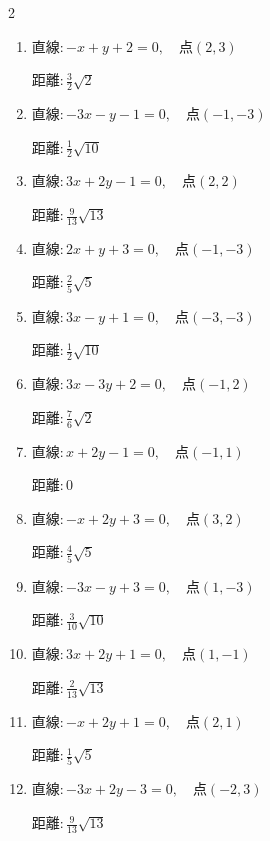 \begin{multicols}{2}
\begin{enumerate}
  \item $直線:-x+y+2=0,\quad 点 ( 2, 3 )$

        $\displaystyle 距離 : \frac{3}{2}\sqrt{2}$

  \item $直線:-3x-y-1=0,\quad 点 ( -1, -3 )$

        $\displaystyle 距離 : \frac{1}{2}\sqrt{10}$

  \item $直線:3x+2y-1=0,\quad 点 ( 2, 2 )$

        $\displaystyle 距離 : \frac{9}{13}\sqrt{13}$

  \item $直線:2x+y+3=0,\quad 点 ( -1, -3 )$

        $\displaystyle 距離 : \frac{2}{5}\sqrt{5}$

  \item $直線:3x-y+1=0,\quad 点 ( -3, -3 )$

        $\displaystyle 距離 : \frac{1}{2}\sqrt{10}$

  \item $直線:3x-3y+2=0,\quad 点 ( -1, 2 )$

        $\displaystyle 距離 : \frac{7}{6}\sqrt{2}$

  \item $直線:x+2y-1=0,\quad 点 ( -1, 1 )$

        $\displaystyle 距離 : 0$

  \item $直線:-x+2y+3=0,\quad 点 ( 3, 2 )$

        $\displaystyle 距離 : \frac{4}{5}\sqrt{5}$

  \item $直線:-3x-y+3=0,\quad 点 ( 1, -3 )$

        $\displaystyle 距離 : \frac{3}{10}\sqrt{10}$

\columnbreak %

  \item $直線:3x+2y+1=0,\quad 点 ( 1, -1 )$

        $\displaystyle 距離 : \frac{2}{13}\sqrt{13}$

  \item $直線:-x+2y+1=0,\quad 点 ( 2, 1 )$

        $\displaystyle 距離 : \frac{1}{5}\sqrt{5}$

  \item $直線:-3x+2y-3=0,\quad 点 ( -2, 3 )$

        $\displaystyle 距離 : \frac{9}{13}\sqrt{13}$


\end{enumerate}
\end{multicols}
